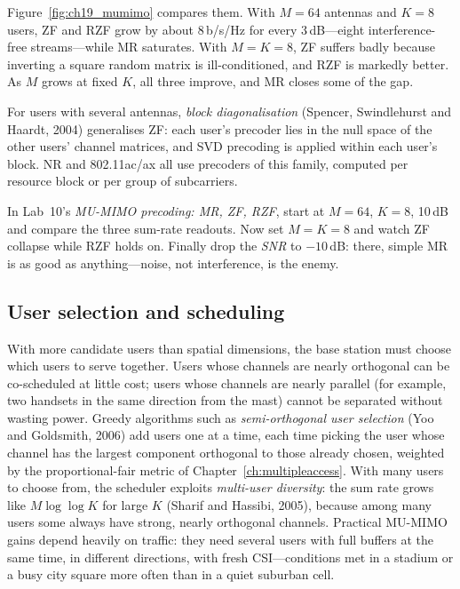 Figure~\ref{fig:ch19_mumimo} compares them. With $M=64$ antennas and $K=8$ users, ZF and RZF grow
by about 8\,b/s/Hz for every 3\,dB---eight interference-free streams---while MR saturates. With
$M=K=8$, ZF suffers badly because inverting a square random matrix is ill-conditioned, and RZF is
markedly better. As $M$ grows at fixed $K$, all three improve, and MR closes some of the gap.

For users with several antennas, \emph{block diagonalisation} (Spencer, Swindlehurst and Haardt,
2004) generalises ZF: each user's precoder lies in the null space of the other users' channel
matrices, and SVD precoding is applied within each user's block. NR and 802.11ac/ax all use
precoders of this family, computed per resource block or per group of subcarriers.

\begin{tryit}
In Lab~10's \emph{MU-MIMO precoding: MR, ZF, RZF}, start at $M=64$, $K=8$, 10\,dB and compare the
three sum-rate readouts. Now set $M=K=8$ and watch ZF collapse while RZF holds on. Finally drop the
\emph{SNR} to $-10$\,dB: there, simple MR is as good as anything---noise, not interference, is the
enemy.
\end{tryit}

\subsection{User selection and scheduling}

With more candidate users than spatial dimensions, the base station must choose which users to
serve together. Users whose channels are nearly orthogonal can be co-scheduled at little cost;
users whose channels are nearly parallel (for example, two handsets in the same direction from the
mast) cannot be separated without wasting power. Greedy algorithms such as \emph{semi-orthogonal
user selection} (Yoo and Goldsmith, 2006) add users one at a time, each time picking the user whose
channel has the largest component orthogonal to those already chosen, weighted by the
proportional-fair metric of Chapter~\ref{ch:multipleaccess}. With many users to choose from, the
scheduler exploits \emph{multi-user diversity}: the sum rate grows like $M\log\log K$ for large $K$
(Sharif and Hassibi, 2005), because among many users some always have strong, nearly orthogonal
channels. Practical MU-MIMO gains depend heavily on traffic: they need several users with full
buffers at the same time, in different directions, with fresh CSI---conditions met in a stadium or
a busy city square more often than in a quiet suburban cell.


